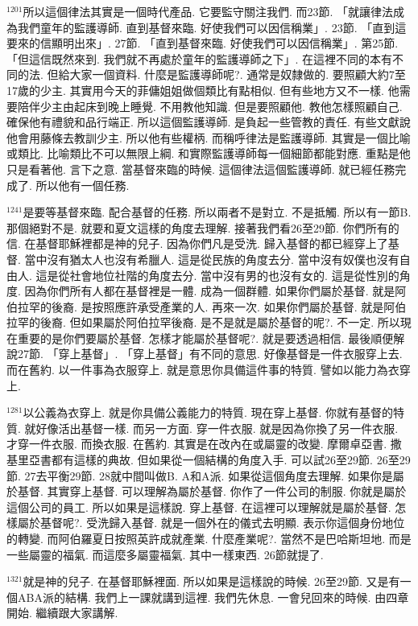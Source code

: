 \documentclass{book}
\begin{document}
$^{1201}$所以這個律法其實是一個時代產品.
它要監守關注我們.
而23節.
「就讓律法成為我們童年的監護導師.
直到基督來臨.
好使我們可以因信稱業」.
23節.
「直到這要來的信顯明出來」.
27節.
「直到基督來臨.
好使我們可以因信稱業」.
第25節.
「但這信既然來到.
我們就不再處於童年的監護導師之下」.
在這裡不同的本有不同的法.
但給大家一個資料.
什麼是監護導師呢?.
通常是奴隸做的.
要照顧大約7至17歲的少主.
其實用今天的菲傭姐姐做個類比有點相似.
但有些地方又不一樣.
他需要陪伴少主由起床到晚上睡覺.
不用教他知識.
但是要照顧他.
教他怎樣照顧自己.
確保他有禮貌和品行端正.
所以這個監護導師.
是負起一些管教的責任.
有些文獻說他會用藤條去教訓少主.
所以他有些權柄.
而稱呼律法是監護導師.
其實是一個比喻或類比.
比喻類比不可以無限上綱.
和實際監護導師每一個細節都能對應.
重點是他只是看著他.
言下之意.
當基督來臨的時候.
這個律法這個監護導師.
就已經任務完成了.
所以他有一個任務.

$^{1241}$是要等基督來臨.
配合基督的任務.
所以兩者不是對立.
不是抵觸.
所以有一節B.
那個絕對不是.
就要和夏文這樣的角度去理解.
接著我們看26至29節.
你們所有的信.
在基督耶穌裡都是神的兒子.
因為你們凡是受洗.
歸入基督的都已經穿上了基督.
當中沒有猶太人也沒有希臘人.
這是從民族的角度去分.
當中沒有奴僕也沒有自由人.
這是從社會地位社階的角度去分.
當中沒有男的也沒有女的.
這是從性別的角度.
因為你們所有人都在基督裡是一體.
成為一個群體.
如果你們屬於基督.
就是阿伯拉罕的後裔.
是按照應許承受產業的人.
再來一次.
如果你們屬於基督.
就是阿伯拉罕的後裔.
但如果屬於阿伯拉罕後裔.
是不是就是屬於基督的呢?.
不一定.
所以現在重要的是你們要屬於基督.
怎樣才能屬於基督呢?.
就是要透過相信.
最後順便解說27節.
「穿上基督」.
「穿上基督」有不同的意思.
好像基督是一件衣服穿上去.
而在舊約.
以一件事為衣服穿上.
就是意思你具備這件事的特質.
譬如以能力為衣穿上.

$^{1281}$以公義為衣穿上.
就是你具備公義能力的特質.
現在穿上基督.
你就有基督的特質.
就好像活出基督一樣.
而另一方面.
穿一件衣服.
就是因為你換了另一件衣服.
才穿一件衣服.
而換衣服.
在舊約.
其實是在改內在或屬靈的改變.
摩爾卓亞書.
撒基里亞書都有這樣的典故.
但如果從一個結構的角度入手.
可以試26至29節.
26至29節.
27去平衡29節.
28就中間叫做B.
A和A派.
如果從這個角度去理解.
如果你是屬於基督.
其實穿上基督.
可以理解為屬於基督.
你作了一件公司的制服.
你就是屬於這個公司的員工.
所以如果是這樣說.
穿上基督.
在這裡可以理解就是屬於基督.
怎樣屬於基督呢?.
受洗歸入基督.
就是一個外在的儀式去明顯.
表示你這個身份地位的轉變.
而阿伯羅夏日按照英許成就產業.
什麼產業呢?.
當然不是巴哈斯坦地.
而是一些屬靈的福氣.
而這麼多屬靈福氣.
其中一樣東西.
26節就提了.

$^{1321}$就是神的兒子.
在基督耶穌裡面.
所以如果是這樣說的時候.
26至29節.
又是有一個ABA派的結構.
我們上一課就講到這裡.
我們先休息.
一會兒回來的時候.
由四章開始.
繼續跟大家講解.
\newpage
\end{document}

